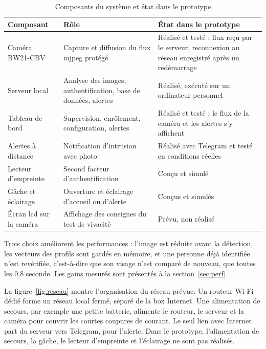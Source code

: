 \begin{table}[H]
\centering
\caption{Composants du système et état dans le prototype}\label{tab:composants}
\small
\begin{tabularx}{\textwidth}{@{}p{3.1cm}XX@{}}
\toprule
\textbf{Composant} & \textbf{Rôle} & \textbf{État dans le prototype} \\
\midrule
Caméra BW21-CBV & Capture et diffusion du flux \gls{mjpeg} protégé & Réalisé et testé : flux reçu par le serveur, reconnexion au réseau enregistré après un redémarrage \\
Serveur local & Analyse des images, authentification, base de données, alertes & Réalisé, exécuté sur un ordinateur personnel \\
Tableau de bord & Supervision, enrôlement, configuration, alertes & Réalisé et testé ; le flux de la caméra et les alertes s'y affichent \\
Alertes à distance & Notification d'intrusion avec photo & Réalisé avec Telegram et testé en conditions réelles \\
Lecteur d'empreinte & Second facteur d'authentification & Conçu et simulé \\
Gâche et éclairage & Ouverture et éclairage d'accueil ou d'alerte & Conçus et simulés \\
Écran \gls{lcd} sur la caméra & Affichage des consignes du test de vivacité & Prévu, non réalisé \\
\bottomrule
\end{tabularx}
\end{table}

Trois choix améliorent les performances : l'image est réduite avant la détection, les vecteurs des profils sont gardés en mémoire, et une personne déjà identifiée n'est revérifiée, c'est-à-dire que son visage n'est comparé de nouveau, que toutes les 0,8 seconde. Les gains mesurés sont présentés à la section~\ref{sec:perf}.

\begin{maj}
La figure~\ref{fig:reseau} montre l'organisation du réseau prévue. Un routeur Wi-Fi dédié forme un réseau local fermé, séparé de la box Internet. Une alimentation de secours, par exemple une petite batterie, alimente le routeur, le serveur et la caméra pour couvrir les courtes coupures de courant. Le seul lien avec Internet part du serveur vers Telegram, pour l'alerte. Dans le prototype, l'alimentation de secours, la gâche, le lecteur d'empreinte et l'éclairage ne sont pas réalisés.
\end{maj}


